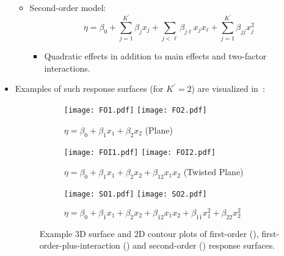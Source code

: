 \begin{itemize}
\begin{itemize}
\begin{itemize}[$\hookrightarrow$]
                        \end{itemize}
                  \item Second-order model:
                        \[ \eta=\beta_0+\sum_{j=1}^{K^\prime}\beta_j x_j+\sum_{j<\ell}\beta_{j\ell}x_j x_\ell+\sum_{j=1}^{K^\prime}\beta_{jj}x_j^2  \]
                        \begin{itemize}[$\hookrightarrow$]
                              \item Quadratic effects in addition to main effects and two-factor interactions.
                        \end{itemize}
            \end{itemize}
      \item Examples of such response surfaces (for $ K^\prime=2 $) are visualized in~:
            \begin{figure}[!htbp]
                  \centering
                  \begin{subfigure}{0.5\textwidth}
                        \centering
                        \texttt{[image: FO1.pdf]}
                        \texttt{[image: FO2.pdf]}
                        \caption{$\eta=\beta_0+\beta_1x_1+\beta_2x_2$ (Plane)}\label{fig:plane}
                  \end{subfigure}
                  \begin{subfigure}{0.5\textwidth}
                        \centering
                        \texttt{[image: FOI1.pdf]}
                        \texttt{[image: FOI2.pdf]}
                        \caption{$\eta=\beta_0+\beta_1x_1+\beta_2x_2+\beta_{12}x_1x_2$ (Twisted Plane)}\label{fig:twplane}
                  \end{subfigure}
                  \begin{subfigure}{0.5\textwidth}
                        \centering
                        \texttt{[image: SO1.pdf]}
                        \texttt{[image: SO2.pdf]}
                        \caption{$\eta=\beta_0+\beta_1x_1+\beta_2x_2+\beta_{12}x_1x_2+\beta_{11}x_1^2+\beta_{22}x_2^2$}\label{fig:secondorder}
                  \end{subfigure}
                  \caption{Example 3D surface and 2D contour plots of first-order (), first-order-plus-interaction ()
                        and second-order () response surfaces.}\label{fig:respsurfaces}

\end{figure}
\end{itemize}
